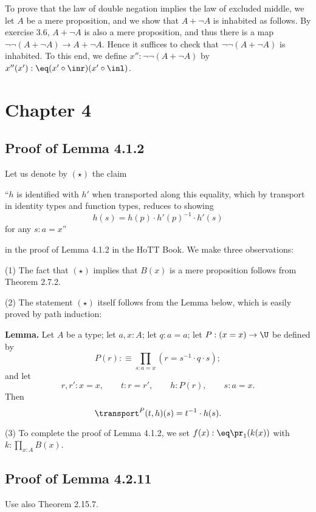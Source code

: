 \documentclass[12pt]{article}
\begin{document}
To prove that the law of double negation implies the law of excluded middle, we let $A$ be a mere proposition, and we show that $A+\neg A$ is inhabited as follows. By exercise 3.6, $A+\neg A$ is also a mere proposition, and thus there is a map $\neg\neg(A+\neg A)\to A+\neg A$. Hence it suffices to check that $\neg\neg(A+\neg A)$ is inhabited. To this end, we define $x'':\neg\neg(A+\neg A)$ by $x''(x'):\eq(x'\circ\inr)(x'\circ\inl)$.


\section{Chapter 4}

\subsection{Proof of Lemma 4.1.2}

Let us denote by $(\star)$ the claim 

\nn ``$h$ is identified with $h'$ when transported along this equality, which by transport in identity types and function types, reduces to showing 
$$
h(s)=h(p)\cdot h'(p)^{-1}\cdot h'(s)
$$ 
for any $s:a=x$''

\nn in the proof of Lemma 4.1.2 in the HoTT Book. We make three observations:

\nn(1) The fact that $(\star)$ implies that $B(x)$ is a mere proposition follows from Theorem 2.7.2. 

\nn(2) The statement $(\star)$ itself follows from the Lemma below, which is easily proved by path induction:

\nn\textbf{Lemma.} Let $A$ be a type; let $a,x:A$; let $q:a=a$; let $P:(x=x)\to\U$ be defined by 
$$
P(r):\equiv\prod_{s:a=x}(r=s^{-1}\cdot q\cdot s);
$$ 
and let 
$$
r,r':x=x,\qquad t:r=r',\qquad h:P(r),\qquad s:a=x.
$$ 
Then 
$$
\transport^P(t,h)(s)=t^{-1}\cdot h(s).
$$ 

\nn(3) To complete the proof of Lemma 4.1.2, we set $f(x):\eq\pr_1(k(x))$ with $k:\prod_{x:A}B(x)$.


\subsection{Proof of Lemma 4.2.11}

Use also Theorem 2.15.7.


\end{document}
